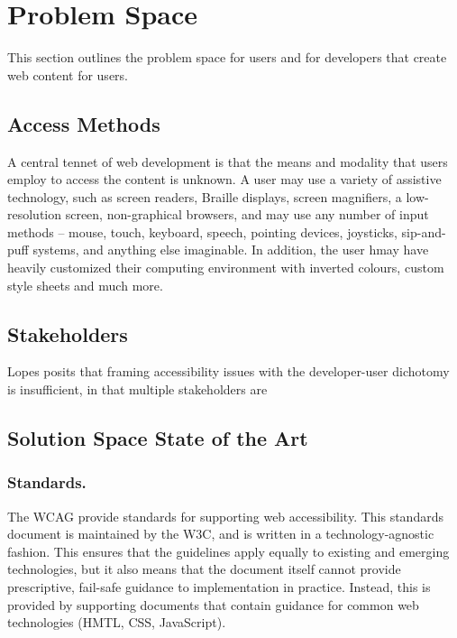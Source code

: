 \section{Problem Space} %
\label{sec:problem_space}

This section outlines the problem space for users and for developers that create web content for users.

\subsection{Access Methods} %
\label{sub:access_methods}

A central tennet of web development is that the means and modality that users employ to access the content is unknown. A user may use a variety of assistive technology, such as screen readers, Braille displays, screen magnifiers, a low-resolution screen, non-graphical browsers, and may use any number of input methods -- mouse, touch, keyboard, speech, pointing devices, joysticks, sip-and-puff systems, and anything else imaginable. In addition, the user hmay have heavily customized their computing environment with inverted colours, custom style sheets and much more. 



\subsection{Stakeholders} %
\label{sub:stakeholders}

Lopes \cite{Lopes:2010} posits that framing accessibility issues with the developer-user dichotomy is insufficient, in that multiple stakeholders are 

\subsection{Solution Space State of the Art} %
\label{sub:state_of_the_art}

\subsubsection{Standards.} %
	\label{ssub:standards_}
	The \ac{WCAG} \cite{wcag:2008} provide standards for supporting web accessibility. This standards document is maintained by the \ac{W3C}, and is written in a technology-agnostic fashion. This ensures that the guidelines apply equally to existing and emerging technologies, but it also means that the document itself cannot provide prescriptive, fail-safe guidance to implementation in practice. Instead, this is provided by supporting documents that contain guidance for common web technologies (HMTL, CSS, JavaScript).	

